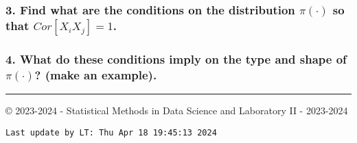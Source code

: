 \documentclass[
]{article}
\begin{document}
\hypertarget{find-what-are-the-conditions-on-the-distribution-picdot-so-that-corx_i-x_j1.}{%
\subsubsection{\texorpdfstring{3. Find what are the conditions on the
distribution \(\pi(\cdot)\) so that
\(Cor[X_i X_j]=1\).}{3. Find what are the conditions on the distribution \textbackslash pi(\textbackslash cdot) so that Cor{[}X\_i X\_j{]}=1.}}\label{find-what-are-the-conditions-on-the-distribution-picdot-so-that-corx_i-x_j1.}}

\hypertarget{what-do-these-conditions-imply-on-the-type-and-shape-of-picdot-make-an-example.}{%
\subsubsection{\texorpdfstring{4. What do these conditions imply on the
type and shape of \(\pi(\cdot)\)? (make an
example).}{4. What do these conditions imply on the type and shape of \textbackslash pi(\textbackslash cdot)? (make an example).}}\label{what-do-these-conditions-imply-on-the-type-and-shape-of-picdot-make-an-example.}}

\vspace{10.5cm}

\begin{center}\rule{0.5\linewidth}{0.5pt}\end{center}

© 2023-2024 - Statistical Methods in Data Science and Laboratory II -
2023-2024

\begin{verbatim}
Last update by LT: Thu Apr 18 19:45:13 2024
\end{verbatim}
\end{document}
